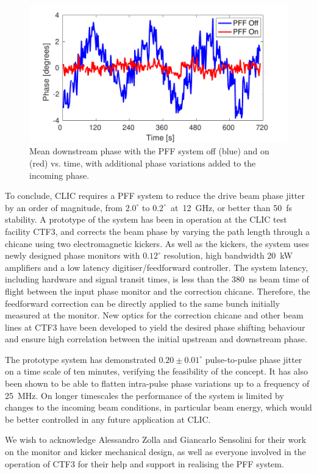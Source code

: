 \documentclass[%
 reprint,
 superscriptaddress,
 amsmath,
 amssymb,
 prl,
]{revtex4-1}
\begin{document}
\begin{figure}
	\includegraphics[width=\columnwidth]{figs/wiggle}
	\caption{\label{fig:wiggle}Mean downstream phase with the PFF system off 
		(blue) and on (red) vs. time, with additional phase variations added to 
		the 
		incoming phase.}
\end{figure}

To conclude, CLIC requires a PFF system to reduce the drive beam phase jitter 
by an order of magnitude, from \(2.0^\circ\) to \(0.2^\circ\)~at~12~GHz, or 
better than 50~fs stability. A prototype of the system has been 
in operation at the CLIC test facility CTF3, and corrects the beam phase by 
varying the path length through a chicane using two electromagnetic kickers. 
As well as the kickers, the system uses newly designed phase monitors with 
\(0.12^\circ\) resolution, high bandwidth 20~kW amplifiers and a low latency 
digitiser/feedforward controller. The system latency, including hardware and 
signal transit times, is less than the 380~ns beam time of flight between the 
input phase monitor and the correction chicane. Therefore, the feedforward 
correction can be directly applied to the same bunch initially measured at the 
monitor. New optics for the correction chicane and other beam lines at CTF3 
have been 
developed to yield the desired phase shifting behaviour and ensure high 
correlation between the initial upstream and downstream phase.

The prototype system has demonstrated \(0.20\pm0.01^\circ\) pulse-to-pulse 
phase jitter on a time scale of ten minutes, verifying the feasibility of the 
concept. It has also been shown to be able 
to flatten intra-pulse phase variations up to a frequency of 25~MHz. On longer 
timescales the performance of the system is limited by changes to the incoming 
beam conditions, in particular beam energy, which would be better controlled in 
any future application at CLIC.

\begin{acknowledgments}
	We wish to acknowledge Alessandro Zolla and Giancarlo Sensolini
	for their work on the monitor and kicker mechanical design,
	as well as everyone involved in the operation of CTF3 for their 
	help and support in realising the PFF system.
\end{acknowledgments}


\end{document}
